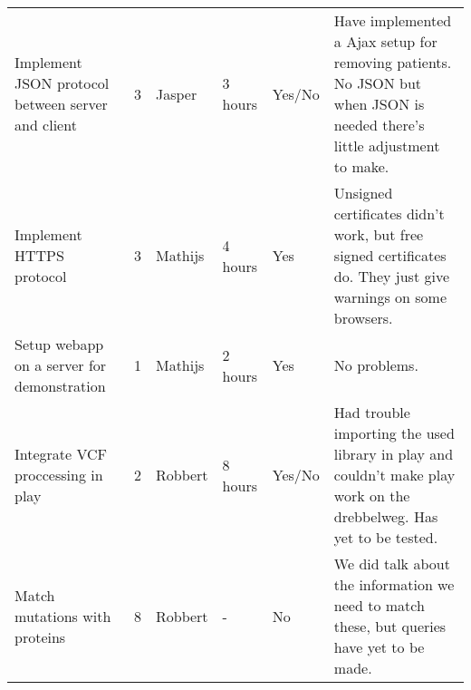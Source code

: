 \documentclass[a4paper]{report}
\begin{document}
\begin{landscape}
\begin{longtable}{p{6cm}|l|l|l|p{2cm}|p{7cm}}
Implement JSON protocol between server and client & 3 & Jasper & 3 hours & Yes/No & Have implemented a Ajax setup for removing patients. No JSON but when JSON is needed there's little adjustment to make.\\
Implement HTTPS protocol & 3 & Mathijs & 4 hours & Yes & Unsigned certificates didn't work, but free signed certificates do. They just give warnings on some browsers.\\
Setup webapp on a server for demonstration & 1 & Mathijs & 2 hours & Yes & No problems.\\
Integrate VCF proccessing in play & 2 & Robbert & 8 hours & Yes/No & Had trouble importing the used library in play and couldn't make play work on the drebbelweg. Has yet to be tested.\\
Match mutations with proteins & 8 & Robbert & - & No & We did talk about the information we need to match these, but queries have yet to be made.\\
\end{longtable}
\end{landscape}
\end{document}
